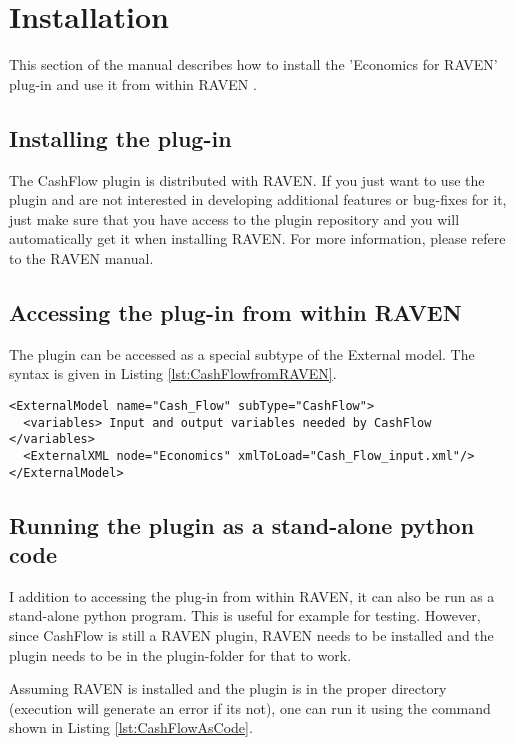 
\section{Installation}
\label{sec:Installation}

This section of the manual describes how to install the 'Economics for RAVEN'  plug-in and use it from within RAVEN \cite{RAVEN}.

\subsection{Installing the plug-in}
The CashFlow plugin is distributed with RAVEN. If you just want to use the plugin and are not interested in developing additional features or bug-fixes for it, just make sure that you have access to the plugin repository and you will automatically get it when installing RAVEN.
For more information, please refere to the RAVEN manual.

\subsection{Accessing the plug-in from within RAVEN}
The plugin can be accessed as a special subtype of the External model. The syntax is given in Listing \ref{lst:CashFlowfromRAVEN}.

\begin{lstlisting}[style=XML,morekeywords={anAttribute},caption=Call CashFlow from RAVEN input., label=lst:CashFlowfromRAVEN]
<ExternalModel name="Cash_Flow" subType="CashFlow">
  <variables> Input and output variables needed by CashFlow  </variables>
  <ExternalXML node="Economics" xmlToLoad="Cash_Flow_input.xml"/>
</ExternalModel>
\end{lstlisting}

\subsection{Running the plugin as a stand-alone python code}

I addition to accessing the plug-in from within RAVEN, it can also be run as a stand-alone python program. This is useful for example for testing. However, since CashFlow is still a RAVEN plugin, RAVEN needs to be installed and the plugin needs to be in the plugin-folder for that to work.

Assuming RAVEN is installed and the plugin is in the proper directory (execution will generate an error if its not), one can run it using the command shown in Listing \ref{lst:CashFlowAsCode}.

